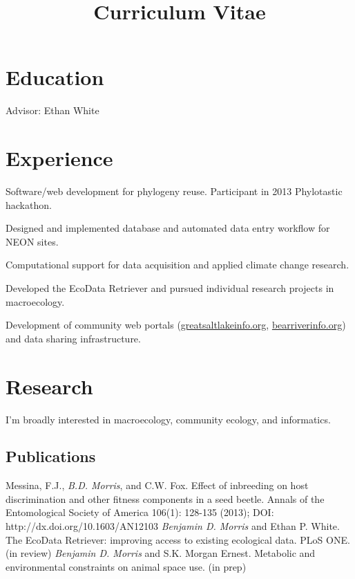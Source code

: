 \documentclass[11pt,letter]{moderncv}
\title{Curriculum Vitae}
\begin{document}
\maketitle


\section{Education}
 {Advisor: Ethan White}


\section{Experience}
{Software/web development for phylogeny reuse. Participant in 2013 Phylotastic hackathon.}

{Designed and implemented database and automated data entry workflow for NEON sites.}

{Computational support for data acquisition and applied climate change research.}

{Developed the EcoData Retriever and pursued individual research projects in macroecology.}

{Development of community web portals (\url{greatsaltlakeinfo.org}, \url{bearriverinfo.org}) 
and data sharing infrastructure.}


\section{Research}
\cvline{}
{I'm broadly interested in macroecology, community ecology, and informatics.}


\subsection{Publications}
 {
    Messina, F.J., \emph{B.D. Morris}, and C.W. Fox. Effect of inbreeding on host discrimination and other 
fitness components in a seed beetle. Annals of the Entomological Society of America 106(1): 128-135 (2013); 
DOI: http://dx.doi.org/10.1603/AN12103
}
\cvline{} {
    \emph{Benjamin D. Morris} and Ethan P. White. The EcoData Retriever: improving access to existing ecological data. PLoS ONE. (in review)
}
\cvline{} {
    \emph{Benjamin D. Morris} and S.K. Morgan Ernest. Metabolic and environmental constraints on animal space use. (in prep)
}
\end{document}
